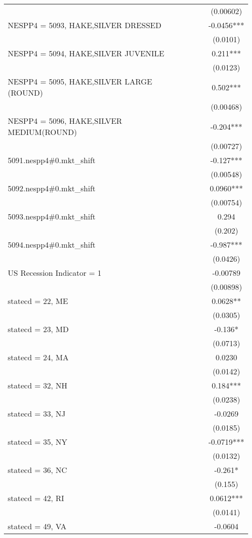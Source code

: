 \begin{tabular}{lccc}
 &  &  & (0.00602) \\
NESPP4 = 5093, HAKE,SILVER DRESSED &  &  & -0.0456*** \\
 &  &  & (0.0101) \\
NESPP4 = 5094, HAKE,SILVER JUVENILE &  &  & 0.211*** \\
 &  &  & (0.0123) \\
NESPP4 = 5095, HAKE,SILVER LARGE (ROUND) &  &  & 0.502*** \\
 &  &  & (0.00468) \\
NESPP4 = 5096, HAKE,SILVER MEDIUM(ROUND) &  &  & -0.204*** \\
 &  &  & (0.00727) \\
5091.nespp4\#0.mkt\_shift &  &  & -0.127*** \\
 &  &  & (0.00548) \\
5092.nespp4\#0.mkt\_shift &  &  & 0.0960*** \\
 &  &  & (0.00754) \\
5093.nespp4\#0.mkt\_shift &  &  & 0.294 \\
 &  &  & (0.202) \\
5094.nespp4\#0.mkt\_shift &  &  & -0.987*** \\
 &  &  & (0.0426) \\
US Recession Indicator = 1 &  &  & -0.00789 \\
 &  &  & (0.00898) \\
statecd = 22, ME &  &  & 0.0628** \\
 &  &  & (0.0305) \\
statecd = 23, MD &  &  & -0.136* \\
 &  &  & (0.0713) \\
statecd = 24, MA &  &  & 0.0230 \\
 &  &  & (0.0142) \\
statecd = 32, NH &  &  & 0.184*** \\
 &  &  & (0.0238) \\
statecd = 33, NJ &  &  & -0.0269 \\
 &  &  & (0.0185) \\
statecd = 35, NY &  &  & -0.0719*** \\
 &  &  & (0.0132) \\
statecd = 36, NC &  &  & -0.261* \\
 &  &  & (0.155) \\
statecd = 42, RI &  &  & 0.0612*** \\
 &  &  & (0.0141) \\
statecd = 49, VA &  &  & -0.0604 \\

\end{tabular}
